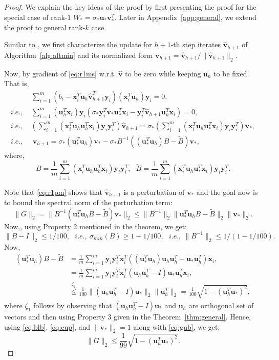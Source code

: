 \documentclass[11pt]{article}
\newcommand{\tp}[1]{{#1}^{T}}
\newcommand{\wh}[1]{\widehat{#1}}
\renewcommand{\u}{\bm{u}}
\renewcommand{\v}{\bm{v}}
\newcommand{\so}{\sigma_*}
\newcommand{\xti}{\tp{\x}_i}
\newcommand{\yti}{\tp{\y}_i}
\newcommand{\vh}{\wh{\v}}
\newcommand{\ut}{\u_h}
\newcommand{\utt}{\tp{\u}_{h}}
\newcommand{\hvtn}{\vh_{h+1}}
\newcommand{\hvtnt}{\tp{\vh}_{h+1}}
\newcommand{\Bo}{\widetilde{B}}
\newcommand{\uo}{\u_* }
\newcommand{\uot}{\tp{\u}_* }
\newcommand{\vo}{\v_* }
\newcommand{\vot}{\tp{\v}_* }
\newcommand{\Wo}{W_*}
\newcommand{\x}{\bm{x}}
\newcommand{\y}{\bm{y}}
\newcommand{\yi}{\y_i}
\begin{document}
\begin{proof}
We explain the key ideas of the proof by first presenting the proof for the special case of rank-$1$ $\Wo=\so \uo \vot$. Later in Appendix~\ref{app:general}, we extend the proof to general rank-$k$ case. 

Similar to \cite{JainNS13}, we first characterize the update for  $h+1$-th step iterates $\widehat{\v}_{h+1}$ of Algorithm~\ref{alg:altmin} and its normalized form $\v_{h+1}=\widehat{\v}_{h+1}/\|\widehat{\v}_{h+1}\|_2$. 

Now, by gradient of \eqref{eq:r1ms} w.r.t. $\vh$ to be zero while keeping $\ut$ to be fixed. That is, 
\begin{align}
 & \sum_{i=1}^m (b_i-\xti\ut\hvtnt\y_i)(\xti\ut)\y_i=0,\nonumber\\
i.e.,\ &\sum_{i=1}^m (\ut^T\x_i)\y_i(\so\yti\vo\uot\x_i-\yti\vh_{h+1}\ut^T\x_i)=0,\nonumber\\
i.e.,\ &\left(\sum_{i=1}^m (\xti\ut\utt\x_i)\y_i\yti\right)\hvtn=\sigma_*\left(\sum_{i=1}^m (\xti\ut\uot\x_i)\y_i\yti\right)\vo,\nonumber\\
i.e.,\ &\ \hvtn=\so (\uot\ut)\vo-\so B^{-1}( (\uot\ut) B-\Bo)\vo,
\label{eq:r1pm}
\end{align}
where, $$B=\frac{1}{m}\sum_{i=1}^m (\xti\ut\utt\x_i)\y_i\yti,\ \ \  \Bo=\frac{1}{m}\sum_{i=1}^m (\xti\ut\uot\x_i)\y_i\yti.$$ 

Note that \eqref{eq:r1pm} shows that $\hvtn$ is a perturbation of $\vo$ and the goal now is to bound the spectral norm of the perturbation term: 
\begin{equation}\label{eq:gub}\|G\|_2= \|B^{-1}( \uot\ut B-\Bo)\vo\|_2\leq \|B^{-1}\|_2\|\uot\ut B-\Bo\|_2\|\vo\|_2.\end{equation}
Now,, using Property 2 mentioned in the theorem, we get: 
\begin{equation}\label{eq:blb}\|B-I\|_2\leq 1/100, \ \ \ i.e.,\ \sigma_{min}(B)\geq 1-1/100,\ \ \ i.e.,\ \|B^{-1}\|_2\leq 1/(1-1/100).\end{equation}
Now, 
\begin{align}
(\uot\ut) B-\Bo&=\frac{1}{m}\sum_{i=1}^m \yi\yti \xti((\uot\ut)\ut\utt-\uo\utt)\x_i,\nonumber\\
&=\frac{1}{m}\sum_{i=1}^m \yi\yti \xti(\ut\utt-I)\uo\utt\x_i,\nonumber\\
&\stackrel{\zeta_1}{\leq} \frac{1}{100}\|(\ut\utt-I)\uo\|_2 \|\utt\|_2= \frac{1}{100}\sqrt{1-(\utt\uo)^2},\label{eq:cup}
\end{align}
where $\zeta_1$ follows by observing that $(\ut\utt-I)\uo$ and $\ut$ are orthogonal set of vectors and then using Property 3 given in the Theorem~\ref{thm:general}. Hence, using \eqref{eq:blb}, \eqref{eq:cup}, and  $\|\vo\|_2=1$ along with \eqref{eq:gub}, we get: 
\begin{equation}
  \label{eq:gub1}
  \|G\|_2\leq \frac{1}{99}\sqrt{1-(\utt\uo)^2}. 
\end{equation}


\end{proof}
\end{document}
